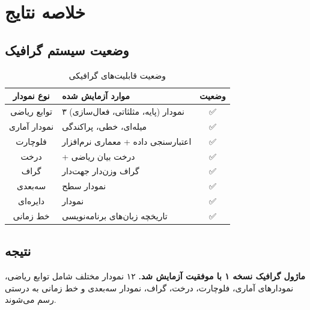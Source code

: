 \documentclass{matinbook}
\begin{document}
\chapter{خلاصه نتایج}

\section{وضعیت سیستم گرافیک}

\begin{table}[h]
\centering
\caption{وضعیت قابلیت‌های گرافیکی}
\label{tab:graphics-status}
\begin{tabular}{|c|C{6cm}|c|}
\hline
\textbf{نوع نمودار} & \textbf{موارد آزمایش شده} & \textbf{وضعیت} \\
\hline
توابع ریاضی & ۳ نمودار (پایه، مثلثاتی، فعال‌سازی) & \textcolor{matingreen}{✅} \\
نمودار آماری & میله‌ای، خطی، پراکندگی & \textcolor{matingreen}{✅} \\
فلوچارت & اعتبارسنجی داده + معماری نرم‌افزار & \textcolor{matingreen}{✅} \\
درخت &  + درخت بیان ریاضی & \textcolor{matingreen}{✅} \\
گراف & گراف وزن‌دار جهت‌دار & \textcolor{matingreen}{✅} \\
سه‌بعدی & نمودار سطح  & \textcolor{matingreen}{✅} \\
دایره‌ای & نمودار  & \textcolor{matingreen}{✅} \\
خط زمانی & تاریخچه زبان‌های برنامه‌نویسی & \textcolor{matingreen}{✅} \\
\hline
\end{tabular}
\end{table}

\section{نتیجه}

\textbf{ماژول گرافیک  نسخه ۱ با موفقیت آزمایش شد.}
۱۲ نمودار مختلف شامل توابع ریاضی، نمودارهای آماری،
فلوچارت، درخت، گراف، نمودار سه‌بعدی و خط زمانی
به درستی رسم می‌شوند. 🎉
\end{document}

